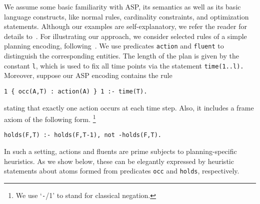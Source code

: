 \documentclass[letterpaper]{article}
\begin{document}
We assume some basic familiarity with ASP, its semantics as well as its basic language constructs,
like normal rules, cardinality constraints, and optimization statements.
Although our examples are self-explanatory, we refer the reader for details to~\cite{gekakasc12a}.
%
For illustrating our approach, 
we consider selected rules of a simple planning encoding, following~\cite{lifschitz02a}.
We use predicates \texttt{action} and \texttt{fluent} to distinguish the corresponding entities.
The length of the plan is given by the constant \texttt{l}, which is used to fix all time points via
the statement \lstinline{time(1..l).}
Moreover, suppose our ASP encoding contains the rule
\begin{lstlisting}
1 { occ(A,T) : action(A) } 1 :- time(T).
\end{lstlisting}
stating that exactly one action occurs at each time step.
Also, it includes a frame axiom of the following form.%
\footnote{We use `\texttt{-}/1' to stand for classical negation.}
\begin{lstlisting}
holds(F,T) :- holds(F,T-1), not -holds(F,T).
\end{lstlisting}
In such a setting, actions and fluents are prime subjects to planning-specific heuristics.
As we show below, these can be elegantly expressed by heuristic statements about atoms formed from
predicates \texttt{occ} and \texttt{holds}, respectively.
\end{document}
